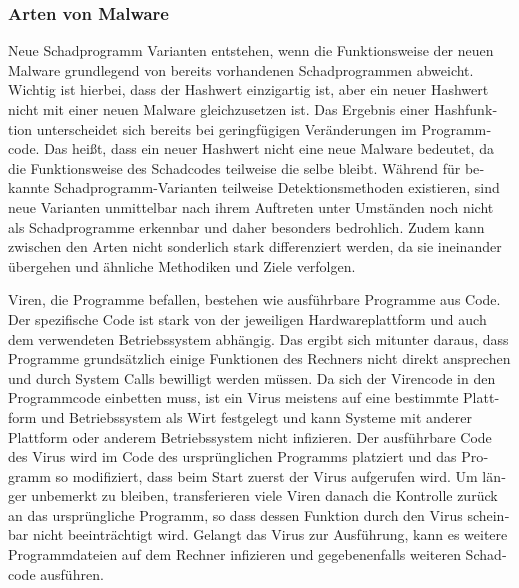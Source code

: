 \begin{otherlanguage}{ngerman}
\subsubsection{Arten von Malware}
Neue Schadprogramm Varianten entstehen, wenn die Funktionsweise der neuen Malware grundlegend von bereits vorhandenen Schadprogrammen abweicht. Wichtig ist hierbei, dass der Hashwert einzigartig ist, aber ein neuer Hashwert nicht mit einer neuen Malware gleichzusetzen ist. Das Ergebnis einer Hashfunktion unterscheidet sich bereits bei geringfügigen Veränderungen im Programmcode. Das heißt, dass ein neuer Hashwert nicht eine neue Malware bedeutet, da die Funktionsweise des Schadcodes teilweise die selbe bleibt. 
\newline Während für bekannte Schadprogramm-Varianten teilweise Detektionsmethoden existieren, sind neue Varianten unmittelbar nach ihrem Auftreten unter Umständen noch nicht als Schadprogramme erkennbar und daher besonders bedrohlich. 
\newline Zudem kann zwischen den Arten nicht sonderlich stark differenziert werden, da sie ineinander übergehen und ähnliche Methodiken und Ziele verfolgen.
\newpage 

    \newline Viren, die Programme befallen, bestehen wie ausführbare Programme aus Code. 
    \newline Der spezifische Code ist stark von der jeweiligen Hardwareplattform und auch dem
    verwendeten Betriebssystem abhängig. Das ergibt sich mitunter daraus, dass Programme grundsätzlich einige Funktionen des Rechners nicht direkt ansprechen und durch System Calls bewilligt werden müssen.
    \newline Da sich der Virencode in den Programmcode einbetten muss, ist ein Virus meistens auf eine bestimmte Plattform und Betriebssystem als Wirt festgelegt und kann Systeme mit anderer Plattform oder anderem Betriebssystem nicht infizieren. 
    \newline Der ausführbare Code des Virus wird im Code des ursprünglichen Programms platziert und das Programm so modifiziert, dass beim Start zuerst der Virus aufgerufen wird.
    \newline Um länger unbemerkt zu bleiben, transferieren viele Viren danach die Kontrolle zurück an das ursprüngliche Programm, so dass dessen Funktion durch den Virus scheinbar nicht beeinträchtigt wird. Gelangt das Virus zur Ausführung, kann es weitere Programmdateien auf dem Rechner infizieren und gegebenenfalls weiteren Schadcode ausführen.
    

\end{otherlanguage}
